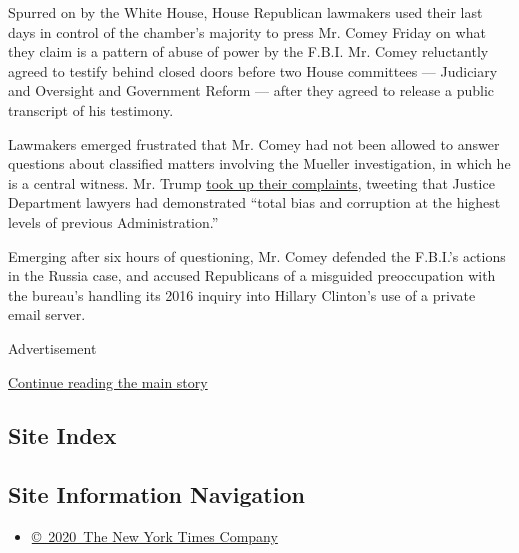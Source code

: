 Spurred on by the White House, House Republican lawmakers used their
last days in control of the chamber's majority to press Mr. Comey Friday
on what they claim is a pattern of abuse of power by the F.B.I. Mr.
Comey reluctantly agreed to testify behind closed doors before two House
committees --- Judiciary and Oversight and Government Reform --- after
they agreed to release a public transcript of his testimony.

Lawmakers emerged frustrated that Mr. Comey had not been allowed to
answer questions about classified matters involving the Mueller
investigation, in which he is a central witness. Mr. Trump
\href{https://twitter.com/realDonaldTrump/status/1071159669949911044}{took
up their complaints}, tweeting that Justice Department lawyers had
demonstrated ``total bias and corruption at the highest levels of
previous Administration.''

Emerging after six hours of questioning, Mr. Comey defended the F.B.I.'s
actions in the Russia case, and accused Republicans of a misguided
preoccupation with the bureau's handling its 2016 inquiry into Hillary
Clinton's use of a private email server.

Advertisement

\protect\hyperlink{after-bottom}{Continue reading the main story}

\hypertarget{site-index}{%
\subsection{Site Index}\label{site-index}}

\hypertarget{site-information-navigation}{%
\subsection{Site Information
Navigation}\label{site-information-navigation}}

\begin{itemize}
\tightlist
\item
  \href{https://help.nytimes.com/hc/en-us/articles/115014792127-Copyright-notice}{©~2020~The
  New York Times Company}
\end{itemize}

